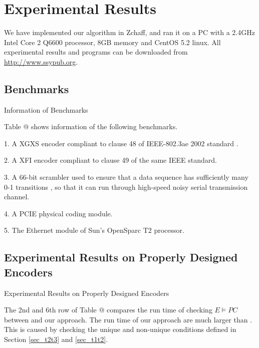 \documentclass[journal]{IEEEtran}
\makeatletter
\newcommand{\Rmnum}[1]{\expandafter\@slowromancap\romannumeral #1@}
\makeatother
\begin{document}
\section{Experimental Results}\label{sec_exp}
We have implemented our algorithm in Zchaff\cite{CHAFF},
and ran it on a PC with a 2.4GHz Intel Core 2 Q6600 processor, 8GB memory and CentOS 5.2 linux.
All experimental results and programs can be downloaded from \url{http://www.ssypub.org}.
\subsection{Benchmarks}
\begin{table}[t]
\centering
\caption{Information of Benchmarks}

\end{table}


Table \Rmnum{1} shows information of the following benchmarks.

1. A XGXS encoder compliant to clause 48 of IEEE-802.3ae 2002 standard \cite{IEEE80232002}.

2. A XFI encoder compliant to clause 49 of the same IEEE standard.

3. A 66-bit scrambler used to ensure
that a data sequence has sufficiently many 0-1 transitions
, so that it can run through high-speed
noisy serial transmission channel.

4. A PCIE physical coding module.

5. The Ethernet module of Sun's OpenSparc T2 processor.

\subsection{Experimental Results on Properly Designed Encoders}
\begin{table}[b]
\centering
\caption{Experimental Results on Properly Designed Encoders}

\end{table}

The 2nd and 6th row of Table \Rmnum{2} compares the run time of checking $E\vDash PC$ between \cite{ShengYuShen:iccad09} and our approach.
The run time of our approach are much larger than \cite{ShengYuShen:iccad09}.
This is caused by checking the unique and non-unique conditions defined in Section \ref{sec_t2t3} and \ref{sec_t1t2}.
\end{document}
